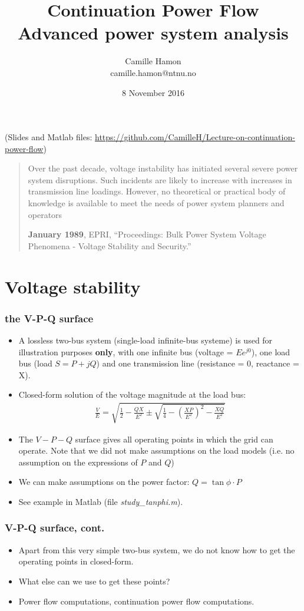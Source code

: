 \documentclass{beamer}
\title{Continuation Power Flow\\Advanced power system analysis}
\author{Camille Hamon\\camille.hamon@ntnu.no}
\date{8 November 2016}
\begin{document}
\begin{frame}[plain]
  \titlepage
{\footnotesize (Slides and Matlab files: \url{https://github.com/CamilleH/Lecture-on-continuation-power-flow})}
\end{frame}

\begin{frame}[plain]
\blockquote[\textbf{January 1989}, EPRI, “Proceedings: Bulk Power System Voltage Phenomena - Voltage Stability and Security.”]{Over the past decade, voltage instability has initiated several severe power system disruptions. Such incidents are likely to increase with increases in transmission line loadings. However, no theoretical or practical body of knowledge is available to meet the needs of power system planners and operators}  
\end{frame}

\section[Volt. Stab.]{Voltage stability}
\begin{frame}
  \frametitle{the V-P-Q surface}
  \begin{itemize}
\item A lossless two-bus system (single-load infinite-bus systeme) is used for illustration purposes \textbf{only}, with one infinite bus (voltage = $Ee^{j0}$), one load bus (load $S = P+jQ$) and one transmission line (resistance = 0, reactance = X).
\item Closed-form solution of the voltage magnitude at the load bus:
  \begin{align*}
    \frac{V}{E} = \sqrt{\frac{1}{2}-\frac{QX}{E^2} \pm \sqrt{\frac{1}{4}-\left( \frac{XP}{E^2} \right)^2 - \frac{XQ}{E^2}}}
  \end{align*}
\item The $V-P-Q$ surface gives all operating points in which the grid can operate. Note that we did not make assumptions on the load models (i.e. no assumption on the expressions of $P$ and $Q$) 
\item We can make assumptions on the power factor: $Q=\tan \phi \cdot P$
\item See example in Matlab (file \emph{study\_tanphi.m}).
  \end{itemize}
\end{frame}

\begin{frame}
  \frametitle{V-P-Q surface, cont.}
  \begin{itemize}
  \item Apart from this very simple two-bus system, we do not know how to get the operating points in closed-form. 
  \item What else can we use to get these points?
  \item<visible@2-> Power flow computations, continuation power flow computations.
  \end{itemize}
\end{frame}
\end{document}
